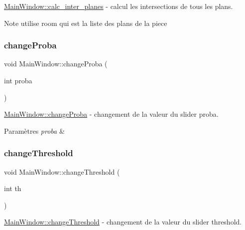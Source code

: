 \hyperlink{classMainWindow_a94ae96c49d6c349e19632d9639926029}{Main\+Window\+::calc\+\_\+inter\+\_\+planes} -\/ calcul les intersections de tous les plans. 

\begin{DoxyNote}{Note}
utilise room qui est la liste des plans de la piece 
\end{DoxyNote}
\mbox{\label{classMainWindow_ab4e79d23cef5c6a44f2cf425976c1aae}} 
\subsubsection{\texorpdfstring{change\+Proba}{changeProba}}
{\footnotesize\ttfamily void Main\+Window\+::change\+Proba (\begin{DoxyParamCaption}\item[{int}]{proba }\end{DoxyParamCaption})\hspace{0.3cm}{\ttfamily [slot]}}



\hyperlink{classMainWindow_ab4e79d23cef5c6a44f2cf425976c1aae}{Main\+Window\+::change\+Proba} -\/ changement de la valeur du slider proba. 


\begin{DoxyParams}{Paramètres}
{\em proba} & \\
\hline
\end{DoxyParams}
\mbox{\label{classMainWindow_ad4486efe33c8da6b53e3d14630c8dc6c}} 
\subsubsection{\texorpdfstring{change\+Threshold}{changeThreshold}}
{\footnotesize\ttfamily void Main\+Window\+::change\+Threshold (\begin{DoxyParamCaption}\item[{int}]{th }\end{DoxyParamCaption})\hspace{0.3cm}{\ttfamily [slot]}}



\hyperlink{classMainWindow_ad4486efe33c8da6b53e3d14630c8dc6c}{Main\+Window\+::change\+Threshold} -\/ changement de la valeur du slider threshold. 



